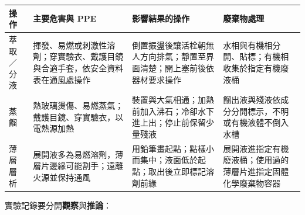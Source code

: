 \documentclass[11pt,a4paper]{article}
\newcounter{none}
\begin{document}
{\def\LTcaptype{none} %
\begin{longtable}[]{@{}
  >{\raggedright\arraybackslash}p{}
  >{\raggedright\arraybackslash}p{}
  >{\raggedright\arraybackslash}p{}
  >{\raggedright\arraybackslash}p{}@{}}
\toprule\noalign{}
\begin{minipage}[b]{\linewidth}\raggedright
操作
\end{minipage} & \begin{minipage}[b]{\linewidth}\raggedright
主要危害與 PPE
\end{minipage} & \begin{minipage}[b]{\linewidth}\raggedright
影響結果的操作
\end{minipage} & \begin{minipage}[b]{\linewidth}\raggedright
廢棄物處理
\end{minipage} \\
\midrule\noalign{}
\endhead
\bottomrule\noalign{}
\endlastfoot
萃取／分液 & 揮發、易燃或刺激性溶劑；穿實驗衣、戴護目鏡與合適手套，依安全資料表在通風處操作 & 倒置振盪後讓活栓朝無人方向排氣；靜置至界面清楚；開上塞前後依器材要求操作 & 水相與有機相分開、貼標；有機相收集於指定有機廢液桶 \\
蒸餾 & 熱玻璃燙傷、易燃蒸氣；戴護目鏡、穿實驗衣，以電熱源加熱 & 裝置與大氣相通；加熱前加入沸石；冷卻水下進上出；停止前保留少量殘液 & 餾出液與殘液依成分分開標示，不明或有機液體不倒入水槽 \\
薄層層析 & 展開液多為易燃溶劑，薄層片邊緣可能割手；遠離火源並保持通風 & 用鉛筆畫起點；點樣小而集中；液面低於起點；取出後立即標記溶劑前緣 & 展開液進指定有機廢液桶；使用過的薄層片進指定固體化學廢棄物容器 \\
\end{longtable}
}

實驗記錄要分開\textbf{觀察}與\textbf{推論}：
\end{document}
